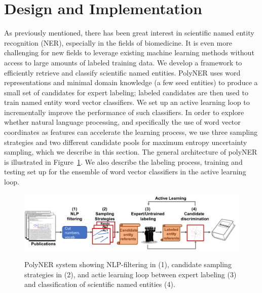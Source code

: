 \label{sect:architecture}
\section{Design and Implementation}
As previously mentioned, there has been great interest in scientific named entity recognition (NER), especially in the fields of biomedicine.  
It is even more challenging for new fields to leverage existing machine learning methods without access to large amounts of labeled training data.
We develop a framework to efficiently retrieve and classify scientific named
entities. 
PolyNER uses word representations and minimal domain knowledge (a few
seed entities) to produce a small set of candidates for expert labeling;
labeled candidates are then used to train named entity word vector classifiers.
We set up an active learning loop to incrementally improve the performance of such classifiers.
In order to explore whether natural language processing, and specifically the use of word vector coordinates as features can accelerate the learning process,
we use three sampling strategies and two different candidate pools for maximum entropy uncertainty sampling, which we describe in this section.
The general architecture of polyNER is illustrated in Figure~\ref{fig:architecture}.
We also describe the labeling process, training and testing set up for the ensemble of word vector classifiers in the active learning loop. 

\begin{figure}[!t]
{\includegraphics[width=\textwidth]{figures/architecture.pdf}}
\caption{\label{fig:architecture} PolyNER system showing NLP-filtering in (1), candidate sampling strategies in (2), and actie learning loop between expert labeling (3) and classification of scientific named entities (4). 
}
\end{figure}

